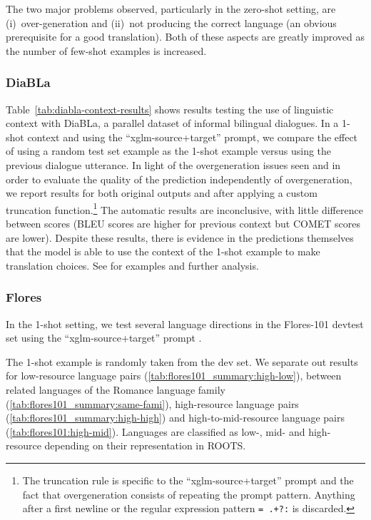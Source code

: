 The two major problems observed, particularly in the zero-shot setting, are (i)~over-generation and (ii)~not producing the correct language (an obvious prerequisite for a good translation). Both of these aspects are greatly improved as the number of few-shot examples is increased. 

\subsubsection{DiaBLa}

Table~\ref{tab:diabla-context-results} shows results testing the use of linguistic context with DiaBLa, a parallel dataset of informal bilingual dialogues. In a 1-shot context and using the ``xglm-source+target'' prompt, we compare the effect of using a random test set example as the 1-shot example versus using the previous dialogue utterance. In light of the overgeneration issues seen and in order to evaluate the quality of the prediction independently of overgeneration, we report results for both original outputs and after applying a custom truncation function.\footnote{The truncation rule is specific to the ``xglm-source+target'' prompt and the fact that overgeneration consists of repeating the prompt pattern. Anything after a first newline or the regular expression pattern \texttt{= .+?:} is discarded.} The automatic results are inconclusive, with little difference between scores (BLEU scores are higher for previous context but COMET scores are lower). Despite these results, there is evidence in the predictions themselves that the model is able to use the context of the 1-shot example to make translation choices. See \citep{bawden-yvon-2023-mt-bloom} for examples and further analysis.

\subsubsection{Flores}

In the 1-shot setting, we test several language directions in the Flores-101 \citep{goyal-etal-2022-flores} devtest set using the ``xglm-source+target'' prompt \citep{lin2021xglm}. 

The 1-shot example is randomly taken from the dev set. We separate out results for low-resource language pairs (\ref{tab:flores101_summary:high-low}), between related languages of the Romance language family (\ref{tab:flores101_summary:same-fami}), high-resource language pairs (\ref{tab:flores101_summary:high-high}) and high-to-mid-resource language pairs (\ref{tab:flores101:high-mid}). 
Languages are classified as low-, mid- and high-resource depending on their representation in ROOTS.

